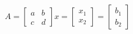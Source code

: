 \documentclass[preview]{standalone}
\begin{document}
\begin{align*}
A = \begin{bmatrix} a & b \\ c & d \end{bmatrix} x = \begin{bmatrix} x_1 \\ x_2 \end{bmatrix} = \begin{bmatrix} b_1 \\ b_2 \end{bmatrix}
\end{align*}
\end{document}
